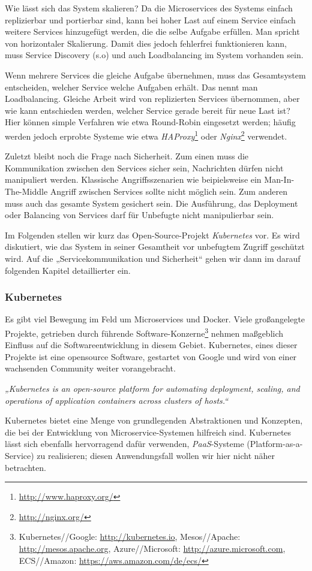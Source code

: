 Wie lässt sich das System skalieren? Da die Microservices des Systems einfach replizierbar und portierbar sind, kann bei hoher Last auf einem Service einfach weitere Services hinzugefügt werden, die die selbe Aufgabe erfüllen. Man spricht von horizontaler Skalierung. Damit dies jedoch fehlerfrei funktionieren kann, muss Service Discovery (s.o) und auch Loadbalancing im System vorhanden sein.

Wenn mehrere Services die gleiche Aufgabe übernehmen, muss das Gesamtsystem entscheiden, welcher Service welche Aufgaben erhält. Das nennt man Loadbalancing. Gleiche Arbeit wird von replizierten Services übernommen, aber wie kann entschieden werden, welcher Service gerade bereit für neue Last ist? Hier können simple Verfahren wie etwa Round-Robin eingesetzt werden; häufig werden jedoch erprobte Systeme wie etwa \textit{HAProxy}\footnote{\url{http://www.haproxy.org/}} oder \textit{Nginx}\footnote{\url{http://nginx.org/}} verwendet.

Zuletzt bleibt noch die Frage nach Sicherheit. Zum einen muss die Kommunikation zwischen den Services sicher sein, Nachrichten dürfen nicht manipuliert werden. Klassische Angriffsszenarien wie beipielsweise ein Man-In-The-Middle Angriff zwischen Services sollte nicht möglich sein. Zum anderen muss auch das gesamte System gesichert sein. Die Ausführung, das Deployment oder Balancing von Services darf für Unbefugte nicht manipulierbar sein. 

Im Folgenden stellen wir kurz das Open-Source-Projekt \textit{Kubernetes} vor. Es wird diskutiert, wie das System in seiner Gesamtheit vor unbefugtem Zugriff geschützt wird. Auf die „Servicekommunikation und Sicherheit“ gehen wir dann im darauf folgenden Kapitel detaillierter ein.

\subsubsection{Kubernetes}
Es gibt viel Bewegung im Feld um Microservices und Docker. Viele großangelegte Projekte, getrieben durch führende Software-Konzerne\footnote{Kubernetes//Google: \url{http://kubernetes.io}, Mesos//Apache: \url{http://mesos.apache.org}, Azure//Microsoft: \url{http://azure.microsoft.com}, ECS//Amazon: \url{https://aws.amazon.com/de/ecs/}} nehmen maßgeblich Einfluss auf die Softwareentwicklung in diesem Gebiet. Kubernetes, eines dieser Projekte ist eine opensource Software, gestartet von Google und wird von einer wachsenden Community weiter vorangebracht.
\begin{center}
    \textit{„Kubernetes is an open-source platform for automating deployment, scaling, and operations of application containers across clusters of hosts.“\cite{k8sdoc}}
\end{center}
Kubernetes bietet eine Menge von grundlegenden Abstraktionen und Konzepten, die bei der Entwicklung von Microservice-Systemen hilfreich sind. Kubernetes lässt sich ebenfalls hervorragend dafür verwenden, \textit{PaaS}-Systeme (Platform-as-a-Service) zu realisieren; diesen Anwendungsfall wollen wir hier nicht näher betrachten.

